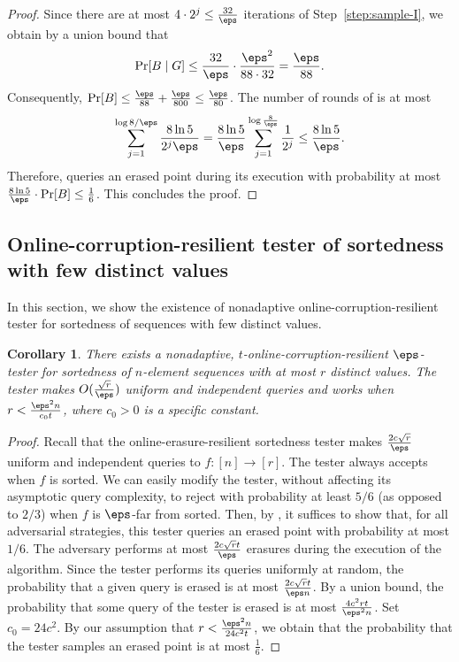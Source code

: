 \documentclass[11pt]{article}
\numberwithin{equation}{section}
\newtheorem{corollary}[theorem]{Corollary}
\theoremstyle{definition}
\theoremstyle{plain}
\begin{document}
\begin{proof}
Since there are at most $4 \cdot 2^j \leq \frac{32}{\eps}$ iterations of Step~\ref{step:sample-I}, we obtain by a union bound that  
\begin{align*}
    \Pr[B \mid G] \leq \frac{32}{\eps} \cdot \frac{\eps^2}{88\cdot 32} = \frac{\eps}{88}.
\end{align*}
Consequently, $\Pr[B] \leq \frac{\eps}{88} + \frac{\eps}{800} \leq \frac{\eps}{80}$. The number of rounds of  is at most
\begin{align*}
    \sum_{j=1}^{\log 8/\eps} \frac{8\ln 5}{2^j \eps } = \frac{8\ln 5}{\eps} \sum_{j=1}^{\log \frac{8}{\eps}}\frac{1}{2^j} \leq \frac{8 \ln 5}{\eps}. 
\end{align*}
Therefore,  queries an erased point during its execution with probability at most $\frac{8\ln 5}{\eps} \cdot \Pr[B] \leq \frac{1}{6}$. This concludes the proof.  
\end{proof}

%
\subsection{Online-corruption-resilient tester of sortedness with few distinct values}\label{sec:sortedness_corrupt}

In this section, we show  the existence of nonadaptive online-corruption-resilient tester for sortedness of sequences with few distinct values. 

\begin{corollary} \label{cor:sortedness_corrupt}
There exists a nonadaptive, $t$-online-corruption-resilient $\eps$-tester for sortedness of $n$-element sequences with at most $r$ distinct values. The tester makes $O(\frac{\sqrt{r}}{\eps})$ uniform and independent queries and works when $r<\frac{\eps^2 n}{c_0 t}$, where $c_0 > 0$ is a specific constant.
\end{corollary}


\begin{proof} %

Recall that the online-erasure-resilient sortedness tester makes $\frac{2c\sqrt{r}}{\eps}$ uniform and independent queries to $f \colon [n]\to [r]$. The tester always accepts when $f$ is sorted. We can easily modify the tester, without affecting its asymptotic query complexity, to reject with probability at least $5/6$ (as opposed to $2/3$) when $f$ is $\eps$-far from sorted. Then, by , it suffices to show that, for all adversarial strategies, this tester queries an erased point with probability at most $1/6$. The adversary performs at most $\frac{2c\sqrt{r}t}{\eps}$ erasures during the execution of the algorithm. Since the tester performs its queries uniformly at random, the probability that a given query is erased is at most $\frac{2c\sqrt{r}t}{\eps n}$. By a union bound, the probability that some query of the tester is erased is at most $\frac{4c^2 r t}{\eps^2 n}$. Set $c_0=24c^2$. By our assumption that $r < \frac{\eps^2 n}{24c^2 t}$, we obtain that the probability that the tester samples an erased point is at most $\frac{1}{6}$. 
\end{proof}
\end{document}
